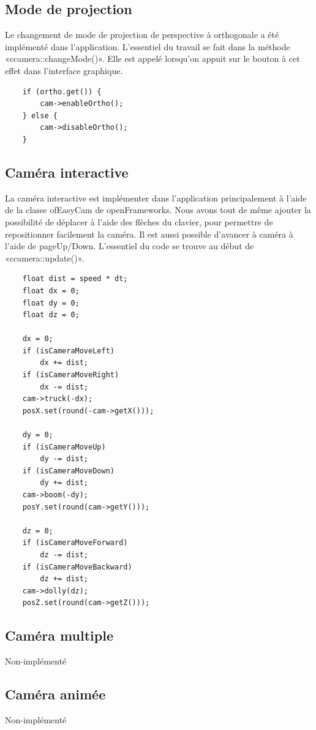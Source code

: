 \subsection{Mode de projection}
Le changement de mode de projection de perspective à orthogonale a été implémenté dans l'application. L'essentiel du travail se fait dans la méthode «ccamera::changeMode()». Elle est appelé lorsqu'on appuit sur le bouton à cet effet dans l'interface graphique.

\begin{lstlisting}
	if (ortho.get()) {
		cam->enableOrtho();
	} else {
		cam->disableOrtho();
	}
\end{lstlisting}

\subsection{Caméra interactive}
La caméra interactive est implémenter dans l'application principalement à l'aide de la classe ofEasyCam de openFrameworks. Nous avons tout de même ajouter la possibilité de déplacer à l'aide des flèches du clavier, pour permettre de repositionner facilement la caméra. Il est aussi possible d'avancer à caméra à l'aide de pageUp/Down. L'essentiel du code se trouve au début de «ccamera::update()».

\begin{lstlisting}
	float dist = speed * dt;
	float dx = 0;
	float dy = 0;
	float dz = 0;
	
	dx = 0;
	if (isCameraMoveLeft)
		dx += dist;
	if (isCameraMoveRight)
		dx -= dist;
	cam->truck(-dx);
	posX.set(round(-cam->getX()));
	
	dy = 0;
	if (isCameraMoveUp)
		dy -= dist;
	if (isCameraMoveDown)
		dy += dist;
	cam->boom(-dy);
	posY.set(round(cam->getY()));
	
	dz = 0;
	if (isCameraMoveForward)
		dz -= dist;
	if (isCameraMoveBackward)
		dz += dist;
	cam->dolly(dz);
	posZ.set(round(cam->getZ()));
\end{lstlisting}

\subsection{Caméra multiple}
Non-implémenté

\subsection{Caméra animée}
Non-implémenté
